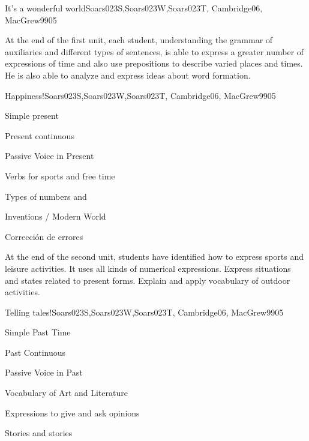 \begin{syllabus}
\begin{unit}{It's a wonderful world}{Soars023S,Soars023W,Soars023T, Cambridge06, MacGrew99}{0}{5}
   \begin{learningoutcomes}
      \item At the end of the first unit, each student, understanding the grammar of auxiliaries and different types of sentences, is able to express a greater number of expressions of time and also use prepositions to describe varied places and times. He is also able to analyze and express ideas about word formation.
   \end{learningoutcomes}
\end{unit}

\begin{unit}{Happiness!}{Soars023S,Soars023W,Soars023T, Cambridge06, MacGrew99}{0}{5}
   \begin{topics}
      \item Simple present
      \item Present continuous
      \item Passive Voice in Present
      \item Verbs for sports and free time
      \item Types of numbers and 
      \item Inventions / Modern World
      \item Corrección de errores
   \end{topics}

   \begin{learningoutcomes}
      \item  At the end of the second unit, students have identified how to express sports and leisure activities. It uses all kinds of numerical expressions. Express situations and states related to present forms. Explain and apply vocabulary of outdoor activities.
   \end{learningoutcomes}
\end{unit}

\begin{unit}{Telling tales!}{Soars023S,Soars023W,Soars023T, Cambridge06, MacGrew99}{0}{5}
   \begin{topics}
      \item Simple Past Time
      \item Past Continuous
      \item Passive Voice in Past
      \item Vocabulary of Art and Literature
      \item Expressions to give and ask opinions
      \item Stories and stories
   \end{topics}


\end{unit}
\end{syllabus}
